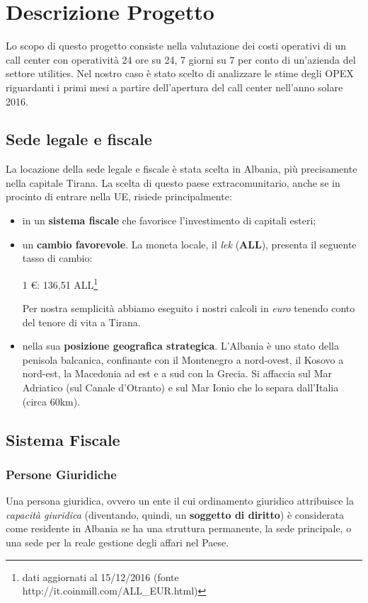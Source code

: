 \chapter*{Descrizione Progetto}
\renewcommand{\thesection}{\arabic{section}}
Lo scopo di questo progetto consiste nella valutazione dei costi operativi di un call center con operatività 24 ore su 24, 7 giorni su 7 per conto di un'azienda del settore utilities.
Nel nostro caso è stato scelto di analizzare le stime degli \ac{OPEX} riguardanti i primi mesi a partire dell'apertura del call center nell'anno solare 2016.
\section[Sede legale e fiscale]{Sede legale e fiscale}
La locazione della sede legale e fiscale è stata scelta in Albania, più precisamente nella capitale Tirana.
La scelta di questo paese extracomunitario, anche se in procinto di entrare nella \ac{UE}\cite{entrataAlbaniaUE}, risiede principalmente:
\begin{itemize}
	\item in un \textbf{sistema fiscale} che favorisce l'investimento di capitali esteri;
	\item un \textbf{cambio favorevole}. La moneta locale, il \textit{lek} (\textbf{ALL}), presenta il seguente tasso di cambio:
	\begin{center}
		1 \euro : 136,51 ALL\footnote{dati aggiornati al 15/12/2016 (fonte http://it.coinmill.com/ALL\_EUR.html)}
	\end{center}
	Per nostra semplicità abbiamo eseguito i nostri calcoli in \textit{euro} tenendo conto del tenore di vita a Tirana.
	\item nella sua \textbf{posizione geografica strategica}. L'Albania è uno stato della penisola balcanica, confinante con il Montenegro a nord-ovest, il Kosovo a nord-est, la Macedonia ad est e a sud con la Grecia. Si affaccia sul Mar Adriatico (sul Canale d'Otranto) e sul Mar Ionio che lo separa dall'Italia (circa 60km).
\end{itemize} 
\section[Sistema Fiscale]{Sistema Fiscale}
  
\subsection[Persone Giuridiche]{Persone Giuridiche}
Una persona giuridica, ovvero un ente il cui ordinamento giuridico attribuisce la \textit{capacità giuridica} (diventando, quindi, un \textbf{soggetto di diritto}) è considerata come residente in Albania se ha una struttura permanente, la sede principale, o una sede per la reale gestione degli affari nel Paese.
